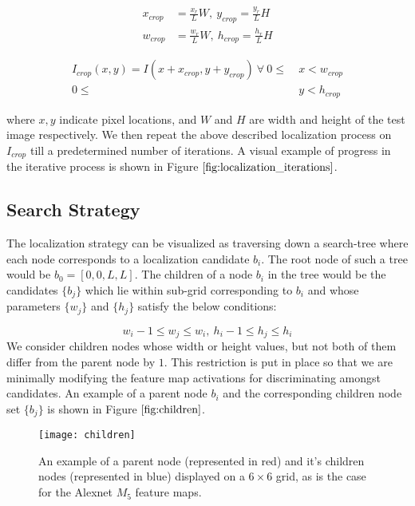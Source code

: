 \documentclass[runningheads]{llncs}
\begin{document}
\begin{equation}
\begin{split}
x_{crop} &= \frac{x_r}{L}{W}, \
y_{crop} = \frac{y_r}{L}{H} \\
w_{crop} &= \frac{w_r}{L}{W}, \
h_{crop} = \frac{h_r}{L}{H}
\end{split}
\end{equation}

\begin{align*}
I_{crop}(x,y) = I(x+x_{crop}, y+y_{crop}) \ \forall \  0 \leq& \ x < w_{crop} \\ 0 \leq& \ y < h_{crop}
\end{align*}

\noindent where $x, y$ indicate pixel locations, and $W$ and $H$ are width and height of the test image respectively. We then repeat the above described localization process on $I_{crop}$ till a predetermined number of iterations. A visual example of progress in the iterative process is shown in Figure $\ref{fig:localization_iterations}$.

\subsection{Search Strategy}
The localization strategy can be visualized as traversing down a search-tree where each node corresponds to a localization candidate $b_i$. The root node of such a tree would be $b_{0} = [0, 0, L, L]$. The children of a node $b_i$ in the tree would be the candidates $\{b_j\}$ which lie within sub-grid corresponding to $b_i$ and whose parameters $\{w_j\}$ and $\{h_j\}$ satisfy the below conditions:

\begin{equation}
w_i-1 \le w_j \le w_i, \ h_i-1 \le h_j \le h_i
\label{eq:children}
\end{equation}
We consider children nodes whose width or height values, but not both of them differ from the parent node by $1$. This restriction is put in place so that we are minimally modifying the feature map activations for discriminating amongst candidates. An example of a parent node $b_i$ and the corresponding  children node set  $\{b_j\}$ is shown in Figure $\ref{fig:children}$.

\begin{figure}
\begin{center}
\texttt{[image: children]}
\end{center}
   \caption{An example of a parent node (represented in red) and it's children nodes (represented in blue) displayed on a $6\times6$ grid, as is the case for the Alexnet $M_{5}$ feature maps. }
\label{fig:children}
\end{figure}
\end{document}
